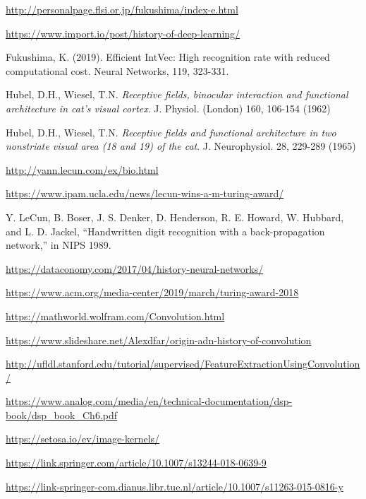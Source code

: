 \begin{thebibliography}{}
 \url{http://personalpage.flsi.or.jp/fukushima/index-e.html}

 \url{https://www.import.io/post/history-of-deep-learning/}

 Fukushima, K. (2019). Efficient IntVec: High recognition rate with reduced computational cost. Neural Networks, 119, 323-331.

 Hubel, D.H., Wiesel, T.N. \textit{Receptive fields, binocular interaction
and functional architecture in cat's visual cortex}. J. Physiol.
(London) 160, 106-154 (1962)

 Hubel, D.H., Wiesel, T.N. \textit{Receptive fields and functional architecture in two nonstriate visual area (18 and 19) of the cat}. J.
Neurophysiol. 28, 229-289 (1965)



 \url{http://yann.lecun.com/ex/bio.html}

 \url{https://www.ipam.ucla.edu/news/lecun-wins-a-m-turing-award/}

 Y. LeCun, B. Boser, J. S. Denker, D. Henderson, R. E. Howard,
W. Hubbard, and L. D. Jackel, “Handwritten digit recognition with a
back-propagation network,” in NIPS 1989.

 \url{https://dataconomy.com/2017/04/history-neural-networks/}

 \url{https://www.acm.org/media-center/2019/march/turing-award-2018}



 \url{https://mathworld.wolfram.com/Convolution.html}

 \url{https://www.slideshare.net/Alexdfar/origin-adn-history-of-convolution}

 \url{http://ufldl.stanford.edu/tutorial/supervised/FeatureExtractionUsingConvolution/}

 \url{https://www.analog.com/media/en/technical-documentation/dsp-book/dsp_book_Ch6.pdf}

 \url{https://setosa.io/ev/image-kernels/}







 \url{https://link.springer.com/article/10.1007/s13244-018-0639-9}

 \url{https://link-springer-com.dianus.libr.tue.nl/article/10.1007/s11263-015-0816-y}



\end{thebibliography}

